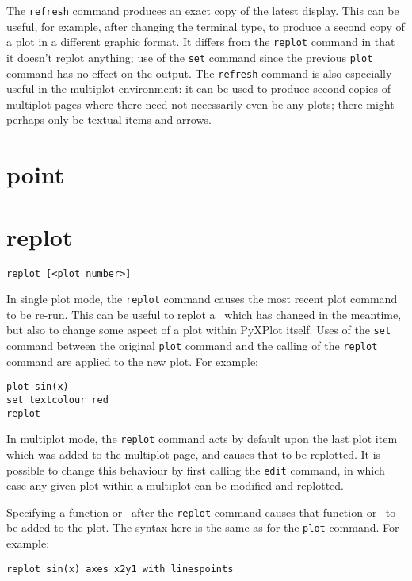 The {\tt refresh} command produces an exact copy of the latest display. This can
be useful, for example, after changing the terminal type, to produce a second
copy of a plot in a different graphic format. It differs from the {\tt replot}
command in that it doesn't replot anything; use of the {\tt set} command since
the previous {\tt plot} command has no effect on the output. The {\tt refresh}
command is also especially useful in the multiplot environment: it can be used
to produce second copies of multiplot pages where there need not necessarily
even be any plots; there might perhaps only be textual items and arrows.


\section{point}


\section{replot}

\begin{verbatim}
replot [<plot number>]
\end{verbatim}

In single plot mode, the {\tt replot} command causes the most recent plot
command to be re-run.  This can be useful to replot a \datafile\ which has changed
in the meantime, but also to change some aspect of a plot within PyXPlot itself.
Uses of the {\tt set} command between the original {\tt plot} command and the
calling of the {\tt replot} command are applied to the new plot. For example:

\begin{verbatim}
plot sin(x)
set textcolour red
replot
\end{verbatim}

In multiplot mode, the {\tt replot} command acts by default upon the last plot
item which was added to the multiplot page, and causes that to be replotted. It
is possible to change this behaviour by first calling the {\tt edit} command, in
which case any given plot within a multiplot can be modified and replotted.

Specifying a function or \datafile\ after the {\tt replot} command causes that
function or \datafile\ to be added to the plot. The syntax here is the same as
for the {\tt plot} command.  For example:

\begin{verbatim}
replot sin(x) axes x2y1 with linespoints
\end{verbatim}

